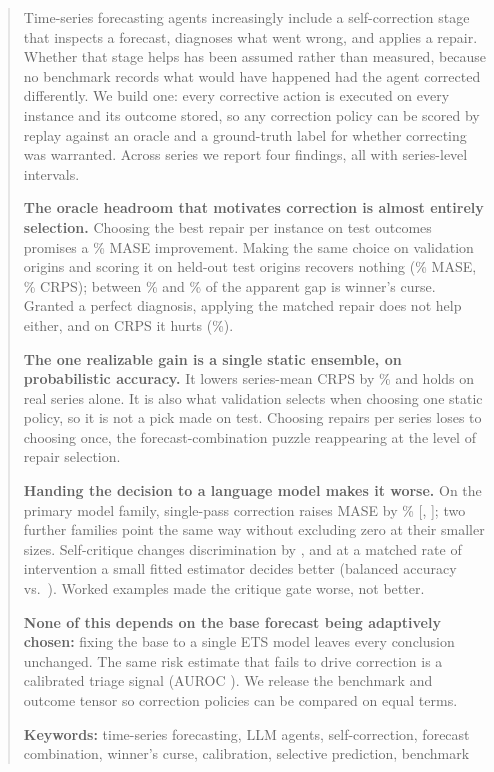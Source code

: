 \begin{abstract}
\noindent
Time-series forecasting agents increasingly include a self-correction stage that
inspects a forecast, diagnoses what went wrong, and applies a repair. Whether that stage
helps has been assumed rather than measured, because no benchmark records what would have
happened had the agent corrected differently. We build one: every corrective action is
executed on every instance and its outcome stored, so any correction policy can be scored
by replay against an oracle and a ground-truth label for whether correcting was warranted.
Across \nseries{} series we report four findings, all with series-level intervals.

\textbf{The oracle headroom that motivates correction is almost entirely selection.}
Choosing the best repair per instance on test outcomes promises a \rdMaseCeilTotalAbs\%
MASE improvement. Making the same choice on validation origins and scoring it on held-out
test origins recovers nothing (\rdMaseRealTotal\% MASE, \rdCrpsRealTotal\% CRPS); between
\rdCrpsCurseShare\% and \rdMaseCurseShare\% of the apparent gap is winner's curse. Granted a
perfect diagnosis, applying the matched repair does not help either, and on CRPS it hurts
(\rdCrpsCanonical\%).

\textbf{The one realizable gain is a single static ensemble, on probabilistic accuracy.}
It lowers series-mean CRPS by \crpsAlwaysEnsembleVsNeverAbs\% and holds on real series alone.
It is also what validation selects when choosing one static policy, so it is not a pick
made on test. Choosing repairs per series loses to choosing once, the forecast-combination
puzzle reappearing at the level of repair selection.

\textbf{Handing the decision to a language model makes it worse.} On the primary model
family, single-pass correction raises MASE by \llmMaseLlmSinglePct\% [\llmMaseLlmSingleCIlo,
\llmMaseLlmSingleCIhi]; two further families point the same way without excluding zero at
their smaller sizes. Self-critique changes discrimination by \discrimAurocDelta{}, and at a
matched rate of intervention a small fitted estimator decides better (balanced accuracy
\discrimBalaccArithmetic{} vs.\ \discrimBalaccCritique{}). Worked examples made the critique
gate worse, not better.

\textbf{None of this depends on the base forecast being adaptively chosen:} fixing the base
to a single ETS model leaves every conclusion unchanged. The same risk estimate that fails
to drive correction is a calibrated triage signal (AUROC \triageauroc{}). We release the
benchmark and outcome tensor so correction policies can be compared on equal terms.

\medskip
\noindent\textbf{Keywords:} time-series forecasting, LLM agents, self-correction,
forecast combination, winner's curse, calibration, selective prediction, benchmark
\end{abstract}
